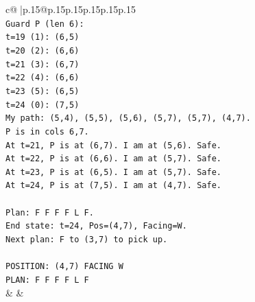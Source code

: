 \documentclass{article}
\begin{document}
{\begin{supertabular}{c@{$\;$}|p{.15\linewidth}@{}p{.15\linewidth}p{.15\linewidth}p{.15\linewidth}p{.15\linewidth}p{.15\linewidth}}
{{{\\ 
\texttt{Guard P (len 6):} \\
\texttt{t=19 (1): (6,5)} \\
\texttt{t=20 (2): (6,6)} \\
\texttt{t=21 (3): (6,7)} \\
\texttt{t=22 (4): (6,6)} \\
\texttt{t=23 (5): (6,5)} \\
\texttt{t=24 (0): (7,5)} \\
\texttt{My path: (5,4), (5,5), (5,6), (5,7), (5,7), (4,7).} \\
\texttt{P is in cols 6,7.} \\
\texttt{At t=21, P is at (6,7). I am at (5,6). Safe.} \\
\texttt{At t=22, P is at (6,6). I am at (5,7). Safe.} \\
\texttt{At t=23, P is at (6,5). I am at (5,7). Safe.} \\
\texttt{At t=24, P is at (7,5). I am at (4,7). Safe.} \\
\\ 
\texttt{Plan: F F F F L F.} \\
\texttt{End state: t=24, Pos=(4,7), Facing=W.} \\
\texttt{Next plan: F to (3,7) to pick up.} \\
\\ 
\texttt{POSITION: (4,7) FACING W} \\
\texttt{PLAN: F F F F L F} \\
            }
        }
    }
    & & \\ \\


\end{supertabular}}
\end{document}
